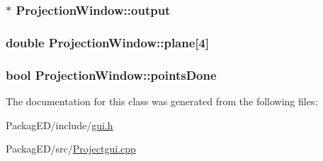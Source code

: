 \subsubsection[{\texorpdfstring{output}{output}}]{$\ast$ Projection\+Window\+::output}\hypertarget{class_projection_window_ab0d78b724ab9b44c72f02de7980091ae}{}\label{class_projection_window_ab0d78b724ab9b44c72f02de7980091ae}
\subsubsection[{\texorpdfstring{plane}{plane}}]{\setlength{\rightskip}{0pt plus 5cm}double Projection\+Window\+::plane\mbox{[}4\mbox{]}}\hypertarget{class_projection_window_aa130209ff4f537cab083939abe684bc4}{}\label{class_projection_window_aa130209ff4f537cab083939abe684bc4}
\subsubsection[{\texorpdfstring{points\+Done}{pointsDone}}]{\setlength{\rightskip}{0pt plus 5cm}bool Projection\+Window\+::points\+Done\hspace{0.3cm}{\ttfamily [private]}}\hypertarget{class_projection_window_a5565d17186a7132c7e05ad548fc281c7}{}\label{class_projection_window_a5565d17186a7132c7e05ad548fc281c7}


The documentation for this class was generated from the following files\+:\begin{DoxyCompactItemize}
\item 
Packag\+E\+D/include/\hyperlink{gui_8h}{gui.\+h}\item 
Packag\+E\+D/src/\hyperlink{_projectgui_8cpp}{Projectgui.\+cpp}\end{DoxyCompactItemize}
